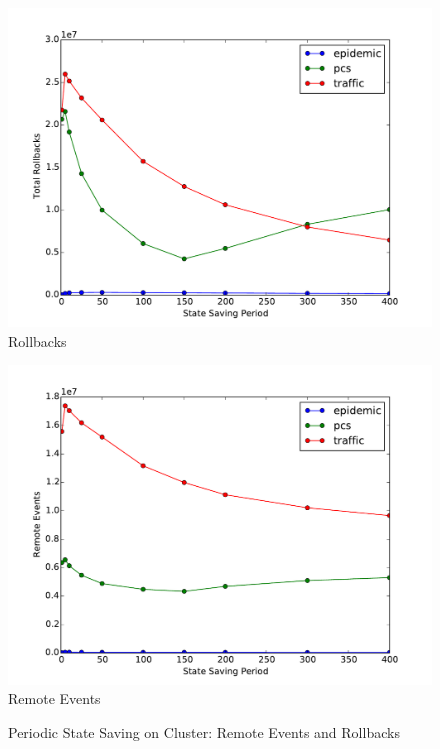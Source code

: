 \documentclass[11pt]{book}
\begin{document}
\begin{figure}
  \begin{minipage}{.5\textwidth}
    \begin{center}
      \includegraphics[width=\textwidth,keepaspectratio,quiet]{figs/state_saving/beowulf/rollbacks.pdf} \\
      Rollbacks \\
    \end{center}
  \end{minipage}%
  \hfill
  \begin{minipage}{.5\textwidth}
    \begin{center}
      \includegraphics[width=\textwidth,keepaspectratio,quiet]{figs/state_saving/beowulf/remote_events.pdf} \\
      Remote Events \\
    \end{center}
  \end{minipage}
  \caption{Periodic State Saving on Cluster: Remote Events and Rollbacks}\label{ssp_analysis_cluster1}
\end{figure}
\end{document}
